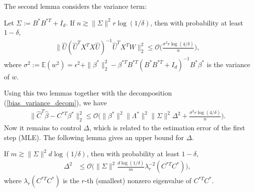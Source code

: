 The second lemma considers the variance term:
\begin{lemma} \label{variance_term}
Let $\Sigma :=B^{*}B^{* T}+I_{d} $. If $n \gtrsim \|\Sigma\|^{2} r \log (1/\delta)$, then with probability at least $1-\delta$, 
\begin{align}
\|\hat{U}(\hat{U}^{T}X^{T}X\hat{U})^{-1}\hat{U}^{T}X^{T} W\|_{2}^{2} \leq \mathcal{O} \bigg(\frac{\sigma^{2}r \log(4/\delta)}{n}\bigg),    
\end{align}
where $\sigma^{2}:=\mathbb{E}(w^{2})=\epsilon^{2}+\|\beta^{*}\|_{2}^{2}-\beta^{* T}B^{* T}(B^{*}B^{* T}+I_{d})^{-1}B^{*}\beta^{*}$ is the variance of $w$.
\end{lemma}
Using this two lemmas together with the decomposition (\ref{bias_variance_decom}), we have 
\begin{align}
\|\hat{C}^{T}\hat{\beta}- C^{* T}\beta^{*}\|_{2}^{2} \leq \mathcal{O}\bigg(\|\beta^{*}\|^{2}\|\Lambda^{*}\|^2\|\Sigma\|^{2} \Delta^{2} + \frac{\sigma^{2}r \log(4/\delta)}{n } \bigg).    
\end{align}
Now it remains to control $\Delta$, which is related to the estimation error of the first step (MLE). The following lemma gives an upper bound for $\Delta$. 
\begin{lemma} \label{Delta_lemma}
If $m \gtrsim \|\Sigma\|^{2} d \log (1/\delta)$, then with probability at least $1-\delta$, 
\begin{align}
\Delta^{2} &\leq \mathcal{O} \bigg(\|\Sigma\|^{2}\frac{d \log (1/\delta)}{m} \lambda_{r}^{-2}(C^{* T}C^{*})\bigg),
\end{align}where $\lambda_{r}(C^{* T}C^{*})$ is the $r$-th (smallest) nonzero eigenvalue of $C^{* T}C^{*}$.
\end{lemma}
